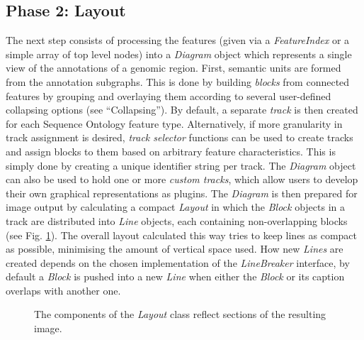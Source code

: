 \documentclass[a4paper]{scrreprt}
\begin{document}
\subsection{Phase 2: Layout}
The next step consists of processing the features (given via a \emph{FeatureIndex} or a simple array of top level nodes) into a \emph{Diagram} object which represents a single view of the annotations of a genomic region. First, semantic units are formed from the annotation subgraphs. This is done by building \emph{blocks} from connected features by grouping and overlaying them according to several user-defined collapsing options (see ``Collapsing''). By default, a separate \emph{track} is then created for each Sequence Ontology feature type. Alternatively, if more granularity in track assignment is desired, \emph{track selector} functions can be used to create tracks and assign blocks to them based on arbitrary feature characteristics. This is simply done by creating a unique identifier string per track. The \emph{Diagram} object can also be used to hold one or more \emph{custom tracks}, which allow users to develop their own graphical representations as plugins. The \emph{Diagram} is then prepared for image output by calculating a compact \emph{Layout} in which the \emph{Block} objects in a track are distributed into \emph{Line} objects, each containing non-overlapping blocks (see Fig. \ref{diagram}). The overall layout calculated this way tries to keep lines as compact as possible, minimising the amount of vertical space used. How new \emph{Lines} are created depends on the chosen implementation of the \emph{LineBreaker} interface, by default a \emph{Block} is pushed into a new \emph{Line} when either the \emph{Block} or its caption overlaps with another one.

\begin{figure}[ht]
\caption{The components of the \emph{Layout} class reflect sections of the resulting image.}
\label{diagram}
\end{figure}
\end{document}
